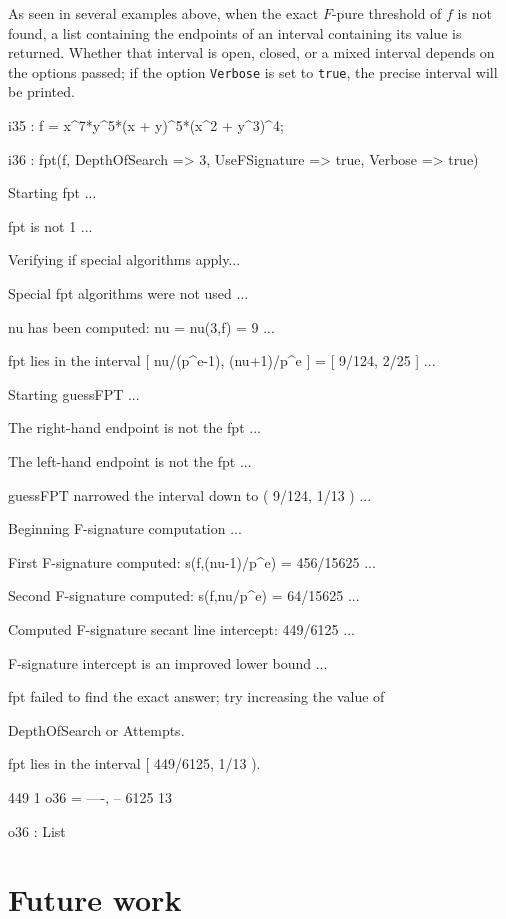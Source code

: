 \documentclass{amsart}
\begin{document}
As seen in several examples above, when the exact  $F$-pure threshold of $f$ is not found, a list containing the endpoints of an interval containing its value is returned.  Whether that interval is open, closed, or a mixed interval depends on the options passed; if the option {\tt Verbose} is set to {\tt true}, the precise interval will be printed.

{\small
{}
\begin{MyVerbatim}

i35 : f = x^7*y^5*(x + y)^5*(x^2 + y^3)^4;

i36 : fpt(f, DepthOfSearch => 3, UseFSignature => true, Verbose => true)

Starting fpt ...

fpt is not 1 ...

Verifying if special algorithms apply...

Special fpt algorithms were not used ...

nu has been computed: nu = nu(3,f) = 9 ...

fpt lies in the interval [ nu/(p^e-1), (nu+1)/p^e ] = [ 9/124, 2/25 ] ...

Starting guessFPT ...

The right-hand endpoint is not the fpt ...

The left-hand endpoint is not the fpt ...

guessFPT narrowed the interval down to ( 9/124, 1/13 ) ...

Beginning F-signature computation ...

First F-signature computed: s(f,(nu-1)/p^e) = 456/15625 ...

Second F-signature computed: s(f,nu/p^e) = 64/15625 ...

Computed F-signature secant line intercept: 449/6125 ...

F-signature intercept is an improved lower bound ...

fpt failed to find the exact answer; try increasing the value of

DepthOfSearch or Attempts.

fpt lies in the interval [ 449/6125, 1/13 ).

        449   1
o36 = {----, --}
       6125  13

o36 : List
\end{MyVerbatim}
}
\medspace


\newpage
\section{Future work}
\end{document}
